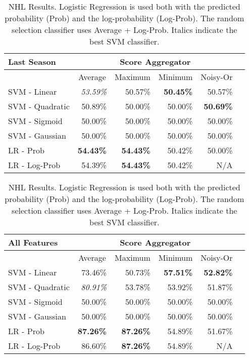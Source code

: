 \documentclass[oribibl]{llncs}%
\begin{document}
\begin{table}[htbp]
\centering
\caption{NHL Results. Logistic Regression is  used both with the predicted probability (Prob) and the log-probability (Log-Prob). The random selection classifier uses Average + Log-Prob. Italics indicate the best SVM classifier.}
\centering
\begin{tabular}{|l|r|r|r|r|r|}
\hline
 Last Season & \multicolumn{4}{c|}{Score Aggregator} \\ \hline
 & \multicolumn{ 1}{c|}{Average} & \multicolumn{ 1}{c|}{Maximum} & \multicolumn{ 1}{c|}{Minimum} &
\multicolumn{ 1}{c|}{Noisy-Or} \\\hline \cline{ 1- 1}
SVM - Linear & \textit{53.59\%} & 50.57\% & \textbf{50.45\%} & 50.57\% \\ \hline
SVM - Quadratic & 50.89\% & 50.00\% & 50.00\% & \textbf{50.69\%} \\ \hline
SVM - Sigmoid & 50.00\% & 50.00\% & 50.00\%  & 50.00\% \\ \hline
SVM - Gaussian & 50.00\% & 50.00\% & 50.00\% & 50.00\% \\ \hline
LR - Prob & \textbf{54.43\%} & \textbf{54.43\%} & 50.42\% & 50.00\% \\ \hline
LR - Log-Prob & 54.39\% & \textbf{54.43\%} & 50.42\% & N/A \\ \hline
\end{tabular}

\centering
\begin{tabular}{|l|r|r|r|r|r|}
\hline
 All Features & \multicolumn{4}{c|}{Score Aggregator}\\ \hline
 & \multicolumn{ 1}{c|}{Average} & \multicolumn{ 1}{c|}{Maximum} & \multicolumn{ 1}{c|}{Minimum} &
\multicolumn{ 1}{c|}{Noisy-Or}  \\\hline \cline{ 1- 1}
SVM - Linear & 73.46\% & 50.73\% & \textbf{57.51\%} & \textbf{52.82\%} \\ \hline
SVM - Quadratic & \textit{80.91\%} & 53.78\% & 53.92\% & 51.87\% \\ \hline
SVM - Sigmoid & 50.00\% & 50.00\% & 50.00\% & 50.00\% \\ \hline
SVM - Gaussian & 50.00\% & 50.00\% & 50.00\% & 50.00\% \\ \hline
LR - Prob & \textbf{87.26\%} & \textbf{87.26\%} & 54.89\% & 51.67\% \\ \hline
LR - Log-Prob & 86.60\% & \textbf{87.26\%} & 54.89\% & N/A \\ \hline
\end{tabular}
\label{table:nhl-score}
\end{table}%
\end{document}
